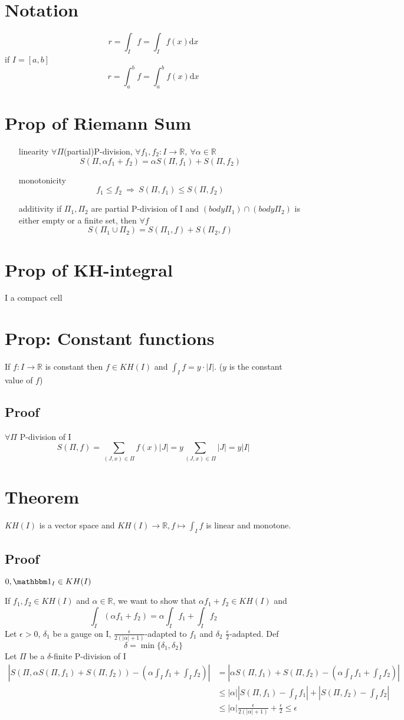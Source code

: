 \documentclass{book}
\newcommand{\abs}[1]{\left\lvert #1 \right\rvert}
\begin{document}
\section{Notation}
$$r=\int_If=\int_If(x)\text{d}x$$
if $I=[a,b]$
$$r=\int_a^bf=\int_a^bf(x)\text{d}x$$
\section{Prop of Riemann Sum}
\begin{itemize}
    \item [linearity]$\forall\Pi$(partial)P-division, $\forall f_1,f_2:I\rightarrow \mathbb R,\ \forall \alpha\in \mathbb R$$$S(\Pi,\alpha f_1+f_2)=\alpha S(\Pi,f_1)+S(\Pi,f_2)$$
    \item [monotonicity]$$f_1\leq f_2\ \Rightarrow\ S(\Pi,f_1)\leq S(\Pi,f_2)$$
    \item [additivity]if $\Pi_1,\Pi_2$ are partial P-division of I and $(body \Pi_1)\cap(body\Pi_2)$ is either empty or a finite set, then $\forall f$$$S(\Pi_1\cup\Pi_2)=S(\Pi_1,f)+S(\Pi_2,f)$$
\end{itemize}
\section{Prop of KH-integral}
I a compact cell
\section{Prop: Constant functions}
If $f:I\rightarrow \mathbb R$ is constant then $f\in KH(I)$ and $\int_If=y\cdot\abs{I}.$ ($y$ is the constant value of $f$)
\subsection*{Proof}
$\forall \Pi$ P-division of I$$S(\Pi,f)=\sum\limits_{(J,x)\in \Pi}f(x)\abs{J}=y\sum\limits_{(J,x)\in \Pi}\abs{J}=y\abs{I}$$
\section{Theorem} $KH(I)$ is a vector space and $KH(I)\rightarrow\mathbb R,f\mapsto \int_If$ is linear and monotone.
\subsection*{Proof}
$0,\mathbbm 1_I\in KH(I)$

If $f_1,f_2\in KH(I)$ and $\alpha\in \mathbb R$, we want to show that $\alpha f_1+f_2\in KH(I)$ and $$\int_I(\alpha f_1+f_2)=\alpha\int_If_1+\int_If_2$$
Let $\epsilon>0$, $\delta_1$ be a gauge on I, $\frac{\epsilon}{2(\abs \alpha+1)}$-adapted to $f_1$ and $\delta_2$ $\frac{\epsilon}2$-adapted. Def $$\delta=\min\{\delta_1,\delta_2\}$$
Let $\Pi$ be a $\delta$-finite P-division of I
$$
\begin{aligned}
    \abs{S(\Pi,\alpha S(\Pi,f_1)+S(\Pi,f_2))-(\alpha\int_If_1+\int_If_2)}&=\abs{\alpha S(\Pi,f_1)+S(\Pi,f_2)-(\alpha\int_If_1+\int_If_2)}\\
    &\leq\abs{\alpha}\abs{S(\Pi,f_1)-\int_If_1}+\abs{S(\Pi,f_2)-\int_If_2}\\
    &\leq\abs{\alpha}\frac{\epsilon}{2(\abs \alpha+1)}+\frac{\epsilon}2\leq \epsilon
\end{aligned}$$
\end{document}
